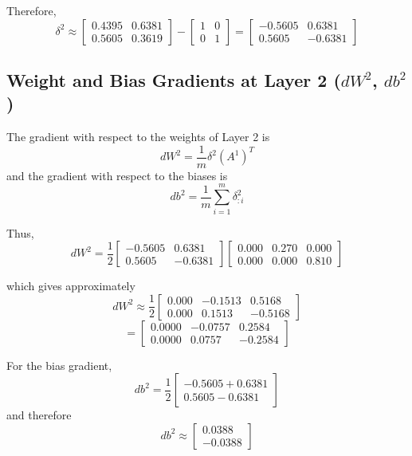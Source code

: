 \documentclass[11pt]{article}
\begin{document}
Therefore,
\[
\delta^2 \approx
\begin{bmatrix} 0.4395 & 0.6381 \\ 0.5605 & 0.3619 \end{bmatrix}
-
\begin{bmatrix} 1 & 0 \\ 0 & 1 \end{bmatrix}
=
\begin{bmatrix} -0.5605 & 0.6381 \\ 0.5605 & -0.6381 \end{bmatrix}
\]

\subsection{Weight and Bias Gradients at Layer 2 (\texorpdfstring{$dW^2$}{dW2}, \texorpdfstring{$db^2$}{db2})}

The gradient with respect to the weights of Layer 2 is
\[
dW^2 = \frac{1}{m}\delta^2 (A^1)^T
\]
and the gradient with respect to the biases is
\[
db^2 = \frac{1}{m}\sum_{i=1}^m \delta^2_{:i}
\]

Thus,
\[
dW^2 = \frac{1}{2} \begin{bmatrix} -0.5605 & 0.6381 \\ 0.5605 & -0.6381 \end{bmatrix} \begin{bmatrix} 0.000 & 0.270 & 0.000 \\ 0.000 & 0.000 & 0.810 \end{bmatrix}
\]

which gives approximately
\[
dW^2 \approx \frac{1}{2} \begin{bmatrix} 0.000 & -0.1513 & 0.5168 \\ 0.000 & 0.1513 & -0.5168 \end{bmatrix}
\]
\[
= \begin{bmatrix} 0.0000 & -0.0757 & 0.2584 \\ 0.0000 & 0.0757 & -0.2584 \end{bmatrix}
\]

For the bias gradient,
\[
db^2 = \frac{1}{2} \begin{bmatrix} -0.5605 + 0.6381 \\ 0.5605 - 0.6381 \end{bmatrix}
\]
and therefore
\[
db^2 \approx \begin{bmatrix} 0.0388 \\ -0.0388 \end{bmatrix}
\]
\end{document}
